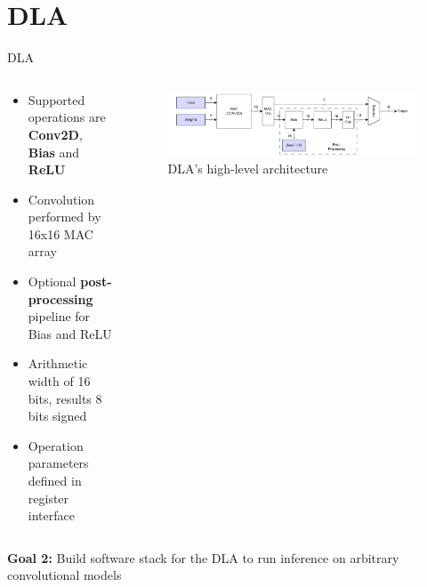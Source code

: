 \section{DLA}
\begin{frame}{DLA}
    \begin{columns}
        \begin{column}{0.4\textwidth}
          \begin{itemize}
                  \item Supported operations are \textbf{Conv2D}, \textbf{Bias} and \textbf{ReLU}
                  \item Convolution performed by 16x16 MAC array
                  \item Optional \textbf{post-processing} pipeline for Bias and ReLU
                  \item Arithmetic width of 16 bits, results 8 bits signed
                  \item Operation parameters defined in register interface
          \end{itemize}
        \end{column}
        \begin{column}{0.6\textwidth}
            \begin{figure}
                \includegraphics[width=1.0\textwidth]{../../thesis/img/dla-internal.pdf}
                \caption{DLA's high-level architecture}
            \end{figure}
        \end{column}
    \end{columns}
    \vfill
  \textbf{Goal 2:} Build software stack for the DLA to run inference on arbitrary convolutional models
\end{frame}


